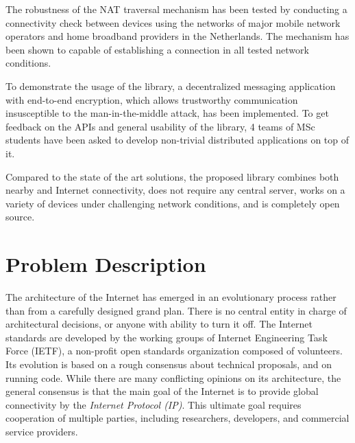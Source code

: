 


The robustness of the NAT traversal mechanism has been tested by conducting a connectivity check between devices using the networks of major mobile network operators and home broadband providers in the Netherlands. The mechanism has been shown to capable of establishing a connection in all tested network conditions.

To demonstrate the usage of the library, a decentralized messaging application with end-to-end encryption, which allows trustworthy communication insusceptible to the man-in-the-middle attack, has been implemented. To get feedback on the APIs and general usability of the library, 4 teams of MSc students have been asked to develop non-trivial distributed applications on top of it.

Compared to the state of the art solutions, the proposed library combines both nearby and Internet connectivity, does not require any central server, works on a variety of devices under challenging network conditions, and is completely open source.

\chapter{Problem Description}

The architecture of the Internet has emerged in an evolutionary process rather than from a carefully designed grand plan. There is no central entity in charge of architectural decisions, or anyone with ability to turn it off. The Internet standards are developed by the working groups of Internet Engineering Task Force (IETF), a non-profit open standards organization composed of volunteers. Its evolution is based on a rough consensus about technical proposals, and on running code. While there are many conflicting opinions on its architecture, the general consensus is that the main goal of the Internet is to provide global connectivity by the \textit{Internet Protocol (IP)}. \cite{internetarchitecture} This ultimate goal requires cooperation of multiple parties, including researchers, developers, and commercial service providers.

